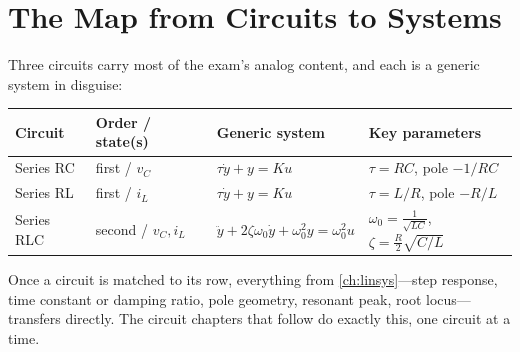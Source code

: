 \section{The Map from Circuits to Systems}
Three circuits carry most of the exam's analog content, and each is a generic
system in disguise:

\begin{center}
\begin{tabularx}{\textwidth}{@{}L{0.15\textwidth}L{0.19\textwidth}L{0.24\textwidth}Y@{}}
\toprule
Circuit & Order / state(s) & Generic system & Key parameters \\
\midrule
Series RC & first / \(v_C\) & \(\tau\dot y+y=Ku\) & \(\tau=RC\), pole \(-1/RC\) \\
Series RL & first / \(i_L\) & \(\tau\dot y+y=Ku\) & \(\tau=L/R\), pole \(-R/L\) \\
Series RLC & second / \(v_C,i_L\) & \(\ddot y+2\zeta\omega_0\dot y+\omega_0^2 y=\omega_0^2u\) & \(\omega_0=\tfrac{1}{\sqrt{LC}}\), \(\zeta=\tfrac{R}{2}\sqrt{C/L}\) \\
\bottomrule
\end{tabularx}
\end{center}

Once a circuit is matched to its row, everything from \cref{ch:linsys}---step
response, time constant or damping ratio, pole geometry, resonant peak, root
locus---transfers directly. The circuit chapters that follow do exactly this,
one circuit at a time.
